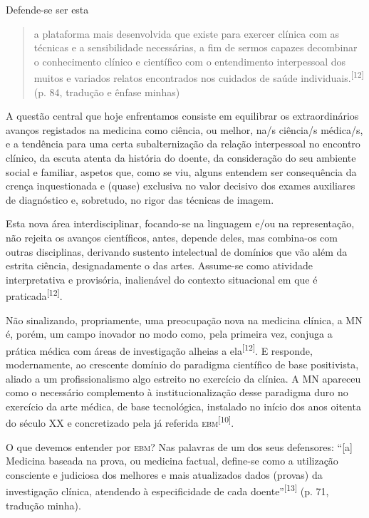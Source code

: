 \documentclass{article}
\begin{document}
Defende-se ser esta
\begin{quote}

a plataforma mais desenvolvida que existe para exercer clínica com as técnicas e
a sensibilidade necessárias, a fim de sermos capazes decombinar o conhecimento
clínico e científico com o entendimento interpessoal dos muitos e variados
relatos encontrados nos cuidados de saúde
individuais.\textsuperscript{[}\textsuperscript{12}\textsuperscript{]}
(p. 84, tradução e ênfase minhas)

\end{quote}

A questão central que hoje enfrentamos consiste em equilibrar os extraordinários
avanços registados na medicina como ciência, ou melhor, na/s ciência/s médica/s,
e a tendência para uma certa subalternização da relação interpessoal no encontro
clínico, da escuta atenta da história do doente, da consideração do seu ambiente
social e familiar, aspetos que, como se viu, alguns entendem ser consequência da
crença inquestionada e (quase) exclusiva no valor decisivo dos exames auxiliares
de diagnóstico e, sobretudo, no rigor das técnicas de imagem.

Esta nova área interdisciplinar, focando-se na linguagem e/ou na representação,
não rejeita os avanços científicos, antes, depende deles, mas combina-os com
outras disciplinas, derivando sustento intelectual de domínios que vão além da
estrita ciência, designadamente o das artes. Assume-se como atividade
interpretativa e provisória, inalienável do contexto situacional em que é
praticada\textsuperscript{[}\textsuperscript{12}\textsuperscript{]}.

Não sinalizando, propriamente, uma preocupação nova na medicina clínica, a MN é,
porém, um campo inovador no modo como, pela primeira vez, conjuga a prática
médica com áreas de investigação alheias a
ela\textsuperscript{[}\textsuperscript{12}\textsuperscript{]}. E responde, modernamente, ao crescente domínio do paradigma científico de base
positivista, aliado a um profissionalismo algo estreito no exercício da clínica.
A MN apareceu como o necessário complemento à institucionalização desse
paradigma duro no exercício da arte médica, de base tecnológica, instalado no
início dos anos oitenta do século XX e concretizado pela já referida
\textsc{ebm}\textsuperscript{[}\textsuperscript{10}\textsuperscript{]}.

O que devemos entender por \textsc{ebm}? Nas palavras de um dos seus defensores: “[a]
Medicina baseada na prova, ou medicina factual, define-se como a utilização
consciente e judiciosa dos melhores e mais atualizados dados (provas) da
investigação clínica, atendendo à especificidade de cada
doente”\textsuperscript{[}\textsuperscript{13}\textsuperscript{]}
(p. 71, tradução minha).
\end{document}
